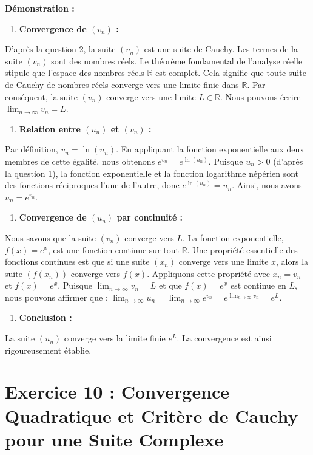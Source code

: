 \documentclass[a4paper,11pt]{report}
\begin{document}
\textbf{Démonstration :}
\begin{enumerate}
\item \textbf{Convergence de $(v_n)$ :}
\end{enumerate}
    D'après la question 2, la suite $(v_n)$ est une suite de Cauchy.
    Les termes de la suite $(v_n)$ sont des nombres réels.
    Le théorème fondamental de l'analyse réelle stipule que l'espace des nombres réels $\mathbb{R}$ est complet. Cela signifie que toute suite de Cauchy de nombres réels converge vers une limite finie dans $\mathbb{R}$.
    Par conséquent, la suite $(v_n)$ converge vers une limite $L \in \mathbb{R}$.
    Nous pouvons écrire $\lim_{n \to \infty} v_n = L$.
\begin{enumerate}
\item \textbf{Relation entre $(u_n)$ et $(v_n)$ :}
\end{enumerate}
    Par définition, $v_n = \ln(u_n)$.
    En appliquant la fonction exponentielle aux deux membres de cette égalité, nous obtenons $e^{v_n} = e^{\ln(u_n)}$.
    Puisque $u_n > 0$ (d'après la question 1), la fonction exponentielle et la fonction logarithme népérien sont des fonctions réciproques l'une de l'autre, donc $e^{\ln(u_n)} = u_n$.
    Ainsi, nous avons $u_n = e^{v_n}$.
\begin{enumerate}
\item \textbf{Convergence de $(u_n)$ par continuité :}
\end{enumerate}
    Nous savons que la suite $(v_n)$ converge vers $L$.
    La fonction exponentielle, $f(x) = e^x$, est une fonction continue sur tout $\mathbb{R}$.
    Une propriété essentielle des fonctions continues est que si une suite $(x_n)$ converge vers une limite $x$, alors la suite $(f(x_n))$ converge vers $f(x)$.
    Appliquons cette propriété avec $x_n = v_n$ et $f(x) = e^x$.
    Puisque $\lim_{n \to \infty} v_n = L$ et que $f(x) = e^x$ est continue en $L$, nous pouvons affirmer que :
    $\lim_{n \to \infty} u_n = \lim_{n \to \infty} e^{v_n} = e^{\lim_{n \to \infty} v_n} = e^L$.
\begin{enumerate}
\item \textbf{Conclusion :}
\end{enumerate}
    La suite $(u_n)$ converge vers la limite finie $e^L$.
    La convergence est ainsi rigoureusement établie.

\vspace{1cm}

\section*{Exercice 10 : Convergence Quadratique et Critère de Cauchy pour une Suite Complexe}
\end{document}
